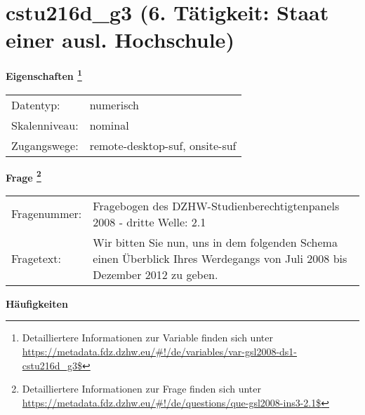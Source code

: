 
    \setcounter{footnote}{0}

    \vspace*{-1.8cm}
	\section{cstu216d\_g3 (6. Tätigkeit: Staat einer ausl. Hochschule)}
	\label{section:cstu216d_g3}



    \vspace*{0.5cm}
    \noindent\textbf{Eigenschaften
	\footnote{Detailliertere Informationen zur Variable finden sich unter
		\url{https://metadata.fdz.dzhw.eu/\#!/de/variables/var-gsl2008-ds1-cstu216d_g3$}}}\\
	\begin{tabularx}{\hsize}{@{}lX}
	Datentyp: & numerisch \\
	Skalenniveau: & nominal \\
	Zugangswege: &
	  remote-desktop-suf, 
	  onsite-suf
 \\
    \end{tabularx}



				\vspace*{0.5cm}
                \noindent\textbf{Frage
	                \footnote{Detailliertere Informationen zur Frage finden sich unter
		              \url{https://metadata.fdz.dzhw.eu/\#!/de/questions/que-gsl2008-ins3-2.1$}}}\\
				\begin{tabularx}{\hsize}{@{}lX}
					Fragenummer: &
					  Fragebogen des DZHW-Studienberechtigtenpanels 2008 - dritte Welle:
					  2.1
 \\
					Fragetext: & Wir bitten Sie nun, uns in dem folgenden Schema einen Überblick Ihres Werdegangs von Juli 2008 bis Dezember 2012 zu geben. \\
				\end{tabularx}





        		\vspace*{0.5cm}
                \noindent\textbf{Häufigkeiten}

